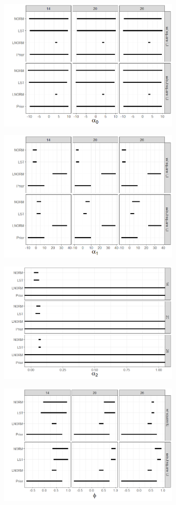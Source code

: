 \documentclass{article}
\begin{document}
\begin{figure}[hbt!]
\centering
\begin{subfigure}
  \centering
  \includegraphics[width=.49\linewidth]{Images/alpha0_post.png}
\end{subfigure}%
\begin{subfigure}
  \centering
  \includegraphics[width=.49\linewidth]{Images/alpha1_post.png}
\end{subfigure}
\begin{subfigure}
  \centering
  \includegraphics[width=.49\linewidth]{Images/alpha2_post.png}
\end{subfigure}%
\begin{subfigure}
  \centering
  \includegraphics[width=.49\linewidth]{Images/phi_post.png}

\end{subfigure}
\end{figure}
\end{document}
